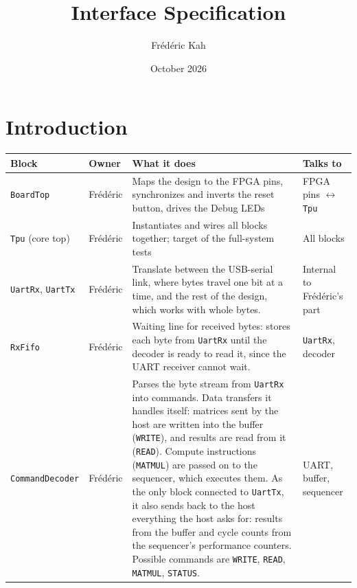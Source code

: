 \documentclass{article}
\title{Interface Specification}
\author{Frédéric Kah}
\date{October 2026}
\begin{document}
\maketitle

\section{Introduction}

\begin{landscape}
\begin{table}[p]
  \centering
  \small
  \renewcommand{\arraystretch}{1.3}
  \begin{tabularx}{\linewidth}{@{} l l >{\raggedright\arraybackslash}X >{\raggedright\arraybackslash}p{5cm} @{}}
    \toprule
    \textbf{Block} & \textbf{Owner} & \textbf{What it does} & \textbf{Talks to} \\
    \midrule
    \texttt{BoardTop} & Frédéric
      & Maps the design to the FPGA pins, synchronizes and inverts the reset button, drives the Debug LEDs
      & FPGA pins $\leftrightarrow$ \texttt{Tpu} \\
    \texttt{Tpu} (core top) & Frédéric
      & Instantiates and wires all blocks together; target of the full-system tests
      & All blocks \\
    \texttt{UartRx}, \texttt{UartTx} & Frédéric
      & Translate between the USB-serial link, where bytes travel one bit at a time,
    and the rest of the design, which works with whole bytes.
      & Internal to Frédéric's part \\
    \texttt{RxFifo} & Frédéric
      & Waiting line for received bytes: stores each byte from \texttt{UartRx}
    until the decoder is ready to read it, since the UART receiver cannot wait.
      & \texttt{UartRx}, decoder \\
    \texttt{CommandDecoder} & Frédéric
      & Parses the byte stream from
    \texttt{UartRx} into commands. Data transfers it handles itself: matrices
    sent by the host are written into the buffer (\texttt{WRITE}), and results
    are read from it (\texttt{READ}). Compute instructions (\texttt{MATMUL})
    are passed on to the sequencer, which executes them. As the only block
    connected to \texttt{UartTx}, it also sends back to the host everything the
    host asks for: results from the buffer and cycle counts from the
    sequencer's performance counters. Possible commands are \texttt{WRITE}, \texttt{READ}, \texttt{MATMUL}, \texttt{STATUS}.
      & UART, buffer, sequencer \\

\end{tabularx}
\end{table}
\end{landscape}
\end{document}
